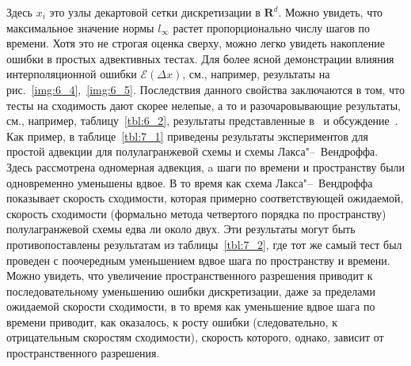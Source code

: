 %
Здесь $x_i$ это узлы декартовой сетки дискретизации в $\mathbf{R}^d$. Можно увидеть, что максимальное значение нормы $l_{\infty}$ растет пропорционально числу шагов по времени. Хотя это не строгая оценка сверху, можно легко увидеть накопление ошибки в простых адвективных тестах. Для более ясной демонстрации влияния интерполяционной ошибки $\mathcal{E}(\Delta x)$, см., например, результаты на рис.~\ref{img:6_4},~\ref{img:6_5}. Последствия данного свойства заключаются в том, что тесты на сходимость дают скорее нелепые, а то и разочаровывающие результаты, см., например, таблицу~\ref{tbl:6_2}, результаты представленные в~\cite{A16} и обсуждение~\cite{A26}. Как пример, в таблице~\ref{tbl:7_1} приведены результаты экспериментов для простой адвекции для полулагранжевой схемы и схемы Лакса"--~Вендроффа. Здесь рассмотрена одномерная адвекция, a шаги по времени и пространству были одновременно уменьшены вдвое. В то время как схема Лакса"--~Вендроффа показывает скорость сходимости, которая примерно соответствующей ожидаемой, скорость сходимости (формально метода четвертого порядка по пространству) полулагранжевой схемы едва ли около двух. Эти результаты могут быть противопоставлены результатам из таблицы~\ref{tbl:7_2}, где тот же самый тест был проведен с поочередным уменьшением вдвое шага по пространству и времени. Можно увидеть, что увеличение пространственного разрешения приводит к последовательному уменьшению ошибки дискретизации, даже за пределами ожидаемой скорости сходимости, в то время как уменьшение вдвое шага по времени приводит, как оказалось, к росту ошибки (следовательно, к отрицательным скоростям сходимости), скорость которого, однако, зависит от пространственного разрешения.
